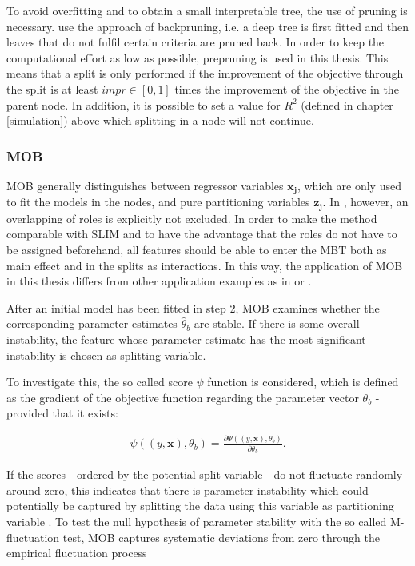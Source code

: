 To avoid overfitting and to obtain a small interpretable tree, the use of pruning is necessary. \citet{Hu.2020} use the approach of backpruning, i.e. a deep tree is first fitted and then leaves that do not fulfil certain criteria are pruned back. 
In order to keep the computational effort as low as possible, prepruning is used in this thesis. This means that a split is only performed if the improvement of the objective through the split is at least $impr \in [0,1]$ times the improvement of the objective in the parent node. In addition, it is possible to set a value for $R^2$ (defined in chapter \ref{simulation}) above which splitting in a node will not continue.




\subsubsection{MOB}
MOB generally distinguishes between regressor variables $\mathbf{x_j}$, which are only used to fit the models in the nodes, and pure partitioning variables $\mathbf{z_j}$. In \citep{Zeileis.2008}, however, an overlapping of roles is explicitly not excluded. 
In order to make the method comparable with SLIM and to have the advantage that the roles do not have to be assigned beforehand, all features should be able to enter the MBT both as main effect and in the splits as interactions.
In this way, the application of MOB in this thesis differs from other application examples as in \citet{Seibold.2016} or \citet{Thomas.2018}. 



After an initial model has been fitted in step 2, MOB examines whether the corresponding parameter estimates $\hat{\theta}_b$ are stable. If there is some overall instability, the feature whose parameter estimate has the most significant instability is chosen as splitting variable.

To investigate this, the so called score $\psi$ function is considered, which is defined as the
gradient of the objective function regarding the parameter vector $\theta_b$ - provided that it exists:

\begin{align}
    \psi \left( \left(y, \mathbf{x} \right), \theta_b \right) = \frac{\partial \Psi\left( \left(y, \mathbf{x} \right), \theta_b \right)}{\partial \theta_b}.
\end{align}

\citep{Zeileis.2008}

If the scores - ordered by the potential split variable - do not fluctuate randomly around zero, this indicates that there is parameter instability which could potentially be captured by splitting the data using this variable as partitioning variable \citep{Schlosser.2019}.
To test the null hypothesis of parameter stability with the so called M-fluctuation test, MOB captures systematic deviations from zero through the empirical fluctuation process

